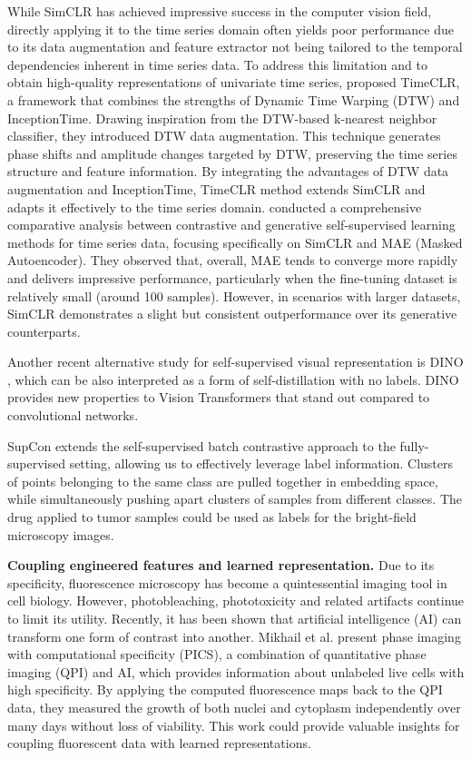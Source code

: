 \documentclass[12pt,twoside,a4paper,parskip]{scrbook} %
\begin{document}
While SimCLR has achieved impressive success in the computer vision field, directly applying it to the time series domain often yields poor performance due to its data augmentation and feature extractor not being tailored to the temporal dependencies inherent in time series data. To address this limitation and to obtain high-quality representations of univariate time series, \cite{YANG2022108606} proposed TimeCLR, a framework that combines the strengths of Dynamic Time Warping (DTW) and InceptionTime. Drawing inspiration from the DTW-based k-nearest neighbor classifier, they introduced DTW data augmentation. This technique generates phase shifts and amplitude changes targeted by DTW, preserving the time series structure and feature information. By integrating the advantages of DTW data augmentation and InceptionTime, TimeCLR method extends SimCLR and adapts it effectively to the time series domain.
\cite{liu2024selfsupervised} conducted a comprehensive comparative analysis between contrastive and generative self-supervised learning methods for time series data, focusing specifically on SimCLR and MAE (Masked Autoencoder). They observed that, overall, MAE tends to converge more rapidly and delivers impressive performance, particularly when the fine-tuning dataset is relatively small (around 100 samples). However, in scenarios with larger datasets, SimCLR demonstrates a slight but consistent outperformance over its generative counterparts.

Another recent alternative study for self-supervised visual representation is DINO \cite{caron2021emerging}, which can be also interpreted as a form of self-distillation with no labels. DINO provides new properties to Vision Transformers that stand out compared to convolutional networks.

SupCon \cite{khosla2021supervised} extends the self-supervised batch contrastive approach to the fully-supervised setting, allowing us to effectively leverage label information. Clusters of points belonging to the same class are pulled together in embedding space, while simultaneously pushing apart clusters of samples from different classes. The drug applied to tumor samples could be used as labels for the bright-field microscopy images.

\textbf{Coupling engineered features and learned representation.}  
Due to its specificity, fluorescence microscopy has become a quintessential imaging tool in cell biology. However, photobleaching, phototoxicity and related artifacts continue to limit its utility. Recently, it has been shown that artificial intelligence (AI) can transform one form of contrast into another. Mikhail et al.\cite{Kandel_2020} present phase imaging with computational specificity (PICS), a combination of quantitative phase imaging (QPI) and AI, which provides information about unlabeled live cells with high specificity. By applying the computed fluorescence maps back to the QPI data, they measured the growth of both nuclei and cytoplasm independently over many days without loss of viability. This work could provide valuable insights for coupling fluorescent data with learned representations.
\end{document}
